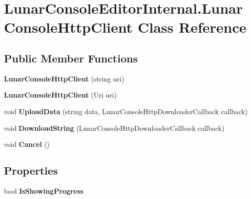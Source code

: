 \hypertarget{class_lunar_console_editor_internal_1_1_lunar_console_http_client}{}\section{Lunar\+Console\+Editor\+Internal.\+Lunar\+Console\+Http\+Client Class Reference}
\label{class_lunar_console_editor_internal_1_1_lunar_console_http_client}
\subsection*{Public Member Functions}
\begin{DoxyCompactItemize}
\item 
\mbox{\label{class_lunar_console_editor_internal_1_1_lunar_console_http_client_af33bd259f9dd6db950fe3b034848256c}} 
{\bfseries Lunar\+Console\+Http\+Client} (string uri)
\item 
\mbox{\label{class_lunar_console_editor_internal_1_1_lunar_console_http_client_a5379f30c9f8f31fd761d9a9949c78b7e}} 
{\bfseries Lunar\+Console\+Http\+Client} (Uri uri)
\item 
\mbox{\label{class_lunar_console_editor_internal_1_1_lunar_console_http_client_aa40a38de8715a101a502a0e01c029886}} 
void {\bfseries Upload\+Data} (string data, Lunar\+Console\+Http\+Downloader\+Callback callback)
\item 
\mbox{\label{class_lunar_console_editor_internal_1_1_lunar_console_http_client_a44ae01873d8dec1079d77b9535c0e9c2}} 
void {\bfseries Download\+String} (Lunar\+Console\+Http\+Downloader\+Callback callback)
\item 
\mbox{\label{class_lunar_console_editor_internal_1_1_lunar_console_http_client_a23b51b856ba337d3a29c009b70ed0f3a}} 
void {\bfseries Cancel} ()
\end{DoxyCompactItemize}
\subsection*{Properties}
\begin{DoxyCompactItemize}
\item 
\mbox{\label{class_lunar_console_editor_internal_1_1_lunar_console_http_client_ac348676a8525a1ad7c9b5c36a674847a}} 
bool {\bfseries Is\+Showing\+Progress}
\end{DoxyCompactItemize}


